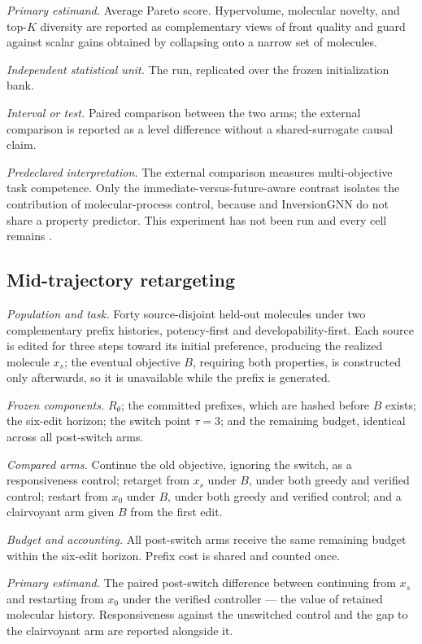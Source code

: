 \emph{Primary estimand.} Average Pareto score. Hypervolume, molecular novelty, and top-$K$ diversity are reported as complementary views of front quality and guard against scalar gains obtained by collapsing onto a narrow set of molecules.

\emph{Independent statistical unit.} The run, replicated over the frozen initialization bank.

\emph{Interval or test.} Paired comparison between the two \method{} arms; the external comparison is reported as a level difference without a shared-surrogate causal claim.

\emph{Predeclared interpretation.} The external comparison measures multi-objective task competence. Only the immediate-versus-future-aware contrast isolates the contribution of molecular-process control, because \method{} and InversionGNN do not share a property predictor. This experiment has not been run and every cell remains \XXX{}.

\subsection{Mid-trajectory retargeting}
\label{app:proto-retarget}

\emph{Population and task.} Forty source-disjoint held-out molecules under two complementary prefix histories, potency-first and developability-first. Each source is edited for three steps toward its initial preference, producing the realized molecule $x_s$; the eventual objective $B$, requiring both properties, is constructed only afterwards, so it is unavailable while the prefix is generated.

\emph{Frozen components.} $R_\theta$; the committed prefixes, which are hashed before $B$ exists; the six-edit horizon; the switch point $\tau=3$; and the remaining budget, identical across all post-switch arms.

\emph{Compared arms.} Continue the old objective, ignoring the switch, as a responsiveness control; retarget from $x_s$ under $B$, under both greedy and verified control; restart from $x_0$ under $B$, under both greedy and verified control; and a clairvoyant arm given $B$ from the first edit.

\emph{Budget and accounting.} All post-switch arms receive the same remaining budget within the six-edit horizon. Prefix cost is shared and counted once.

\emph{Primary estimand.} The paired post-switch difference between continuing from $x_s$ and restarting from $x_0$ under the verified controller --- the value of retained molecular history. Responsiveness against the unswitched control and the gap to the clairvoyant arm are reported alongside it.

